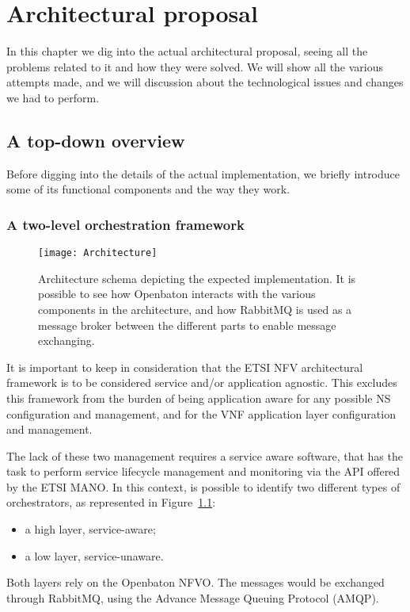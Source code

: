 \chapter{Architectural proposal}
\label{chap:archimpl}
 
In this chapter we dig into the actual architectural proposal, seeing all the
problems related to it and how they were solved. We will show all the various
attempts made, and we will discussion about the technological issues and changes
we had to perform.

\section{A top-down overview}

Before digging into the details of the actual implementation, we briefly
introduce some of its functional components and the way they work.

\subsection{A two-level orchestration framework}
\begin{figure}[t]
  \centering
  \texttt{[image: Architecture]}
  \caption[Architecture schema depicting the expected
    implementation]{Architecture schema depicting the expected implementation.
    It is possible to see how Openbaton interacts with the various components in
    the architecture, and how RabbitMQ is used as a message broker between the
    different parts to enable message exchanging.}
  \label{chap:archimpl:sec:fistattempt:img:architecture}
\end{figure}

It is important to keep in consideration that the ETSI NFV architectural
framework is to be considered service and/or application agnostic. This excludes
this framework from the burden of being application aware for any possible NS
configuration and management, and for the VNF application layer configuration
and management.

The lack of these two management requires a service aware software, that has the
task to perform service lifecycle management and monitoring via the API offered
by the ETSI MANO. In this context, is possible to identify two different types
of orchestrators, as represented in
Figure~\ref{chap:archimpl:sec:fistattempt:img:architecture}:
\begin{itemize}
\item a high layer, service-aware;
\item a low layer, service-unaware.
\end{itemize}
Both layers rely on the Openbaton NFVO. The messages would be exchanged through
RabbitMQ, using the Advance Message Queuing Protocol (AMQP).

